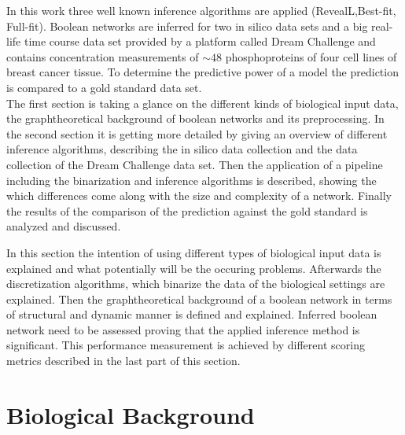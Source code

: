 In this work three well known inference algorithms are applied (RevealL,Best-fit, Full-fit).
\citep{10.1371/journal.pone.0171097}
Boolean networks are inferred for two in silico data sets and a big real-life time course data set provided by a platform called Dream Challenge and contains concentration measurements of $\sim 48$ phosphoproteins of four cell lines of breast cancer tissue. To determine the predictive power of a model the prediction is compared to a gold standard data set.\\
The first section is taking a glance on the different kinds of biological input data, the graphtheoretical background of boolean networks and its preprocessing.
In the second section it is getting more detailed by giving an overview of different inference algorithms, describing the in silico data collection and the data collection of the Dream Challenge data set. Then the application of a pipeline including the binarization and inference algorithms is described, showing the which differences come along with the size and complexity of a network. Finally the results of the comparison of the prediction against the gold standard is analyzed and discussed.

In this section the intention of using different types of biological input data is explained and what potentially will be the occuring problems. Afterwards the discretization algorithms, which binarize the data of the biological settings are explained. Then the graphtheoretical background of a boolean network in terms of structural and dynamic manner is defined and explained. Inferred boolean network need to be assessed proving that the applied inference method is significant. This performance measurement is achieved by different scoring metrics described in the last part of this section.


\section{Biological Background}

